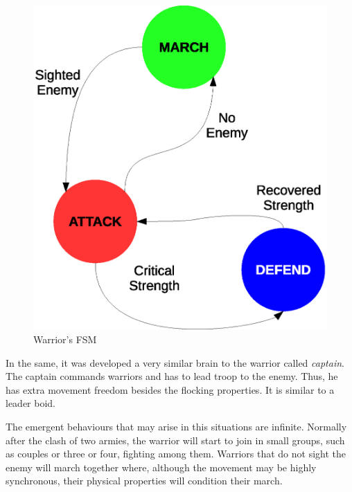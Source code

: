 \begin{figure}[!h]
  \centering
 \includegraphics[scale=0.35]{warriorFSM.eps}
  \caption{Warrior's FSM}
\end{figure}

In the same, it was developed a very similar brain to the warrior called \emph{captain}. The captain commands warriors and has to lead troop to the enemy. Thus, he has extra movement freedom besides the flocking properties. It is similar to a leader boid.

The emergent behaviours that may arise in this situations are infinite. Normally after the clash of two armies, the warrior will start to join in small groups, such as couples or three or four, fighting among them. Warriors that do not sight the enemy will march together where, although the movement may be highly synchronous, their physical properties will condition their march.

